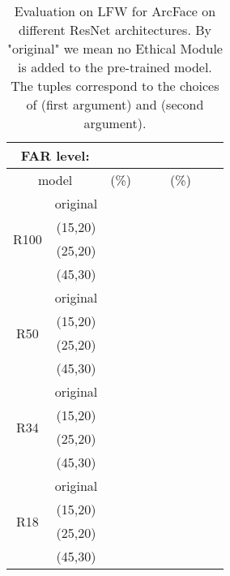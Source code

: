 \documentclass[nohyperref]{article}
\theoremstyle{plain}
\theoremstyle{definition}
\theoremstyle{remark}
\begin{document}
\begin{table*}
\center
\caption{Evaluation on LFW for ArcFace on different ResNet architectures. By "original" we mean no Ethical Module is added to the pre-trained model. The tuples correspond to the choices of  (first argument) and  (second argument).}
\begin{tabular}{ c | c | ccc | ccc}
 \multicolumn{2}{c}{ FAR level: }         & \multicolumn{3}{c}{ } & \multicolumn{3}{c}{ } \\ 
 \hline \hline
  \multicolumn{2}{c}{model}    &  (\%)  &   &   &  (\%)  &         &         \\ \hline
                              & original  &  &  &   &   &  &   \\
  \multirow{2}{*}{R100}        & (15,20) &  &  &  &   &  &   \\
                              & (25,20) &  &  &  &  &  &   \\
                              & (45,30) &  &  &  &   &  &   \\ \hline     
                              & original  &  &  &  &   &  &  \\
  \multirow{2}{*}{R50}        & (15,20) &  &  &  &   &  &   \\
                              & (25,20) &  &  &  &  &  &   \\
                              & (45,30) &  &  &  &   &  &   \\ \hline 
                              & original  &  &  &  &   &  &  \\
\multirow{2}{*}{R34}          & (15,20) &  &  &  &   &  &   \\
                              & (25,20) &  &  &  &   &  &  \\
                              & (45,30) &  &  &  &   &  &   \\ \hline 
                              & original  &  &  &  &   &  &  \\
  \multirow{2}{*}{R18}        & (15,20) &  &  &  &   &  &   \\
                              & (25,20) &  &  &  &   &  &  \\
                              & (45,30) &  &  &  &   &  &   \\ \hline 
\end{tabular}
\label{tab:table6}
\end{table*}
\end{document}
